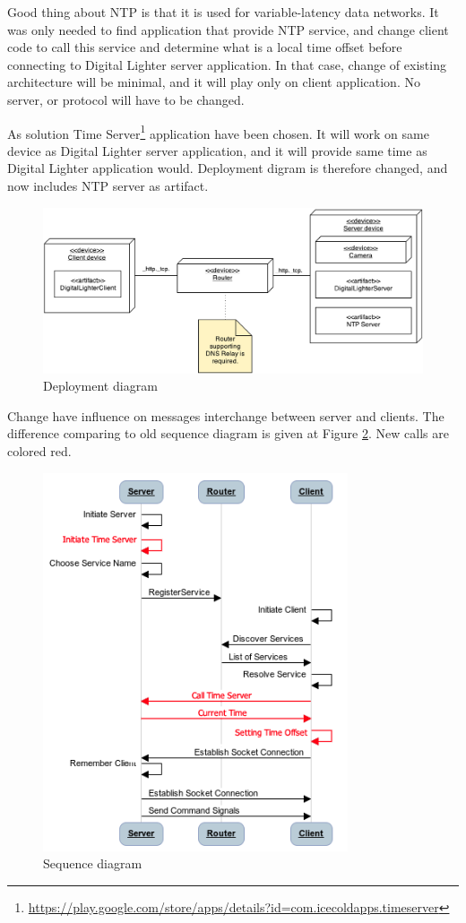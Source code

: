 Good thing about NTP is that it is used for variable-latency data networks. It was only needed to find application that provide NTP service, and change client code to call this service and determine what is a local time offset before connecting to Digital Lighter server application. In that case, change of existing architecture will be minimal, and it will play only on client application. No server, or protocol will have to be changed.

As solution Time Server\footnote{\url{https://play.google.com/store/apps/details?id=com.icecoldapps.timeserver}} application have been chosen. It will work on same device as Digital Lighter server application, and it will provide same time as Digital Lighter application would. Deployment digram is therefore changed, and now includes NTP server as artifact. 

\begin{figure}[H]
	\centering
		\includegraphics[width=15cm]{images/deployment-diagram-sprint5}
	\caption{Deployment diagram}
	\label{fig:sprint5_deployment_diagram}
\end{figure}

Change have influence on messages interchange between server and clients. The difference comparing to old sequence diagram is given at Figure \ref{fig:sprint5_sequence_diagram}. New calls are colored red. 

\begin{figure}[H]
	\centering
		\includegraphics[width=9cm]{sprint5/communication}
	\caption{Sequence diagram}
	\label{fig:sprint5_sequence_diagram}
\end{figure}

